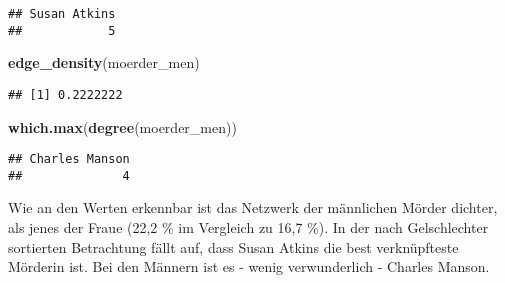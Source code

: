 \documentclass[
]{article}
\newenvironment{Shaded}{\begin{snugshade}}{\end{snugshade}}
\newcommand{\KeywordTok}[1]{\textcolor[rgb]{0.13,0.29,0.53}{\textbf{#1}}}
\newcommand{\NormalTok}[1]{#1}
\begin{document}
\begin{verbatim}
## Susan Atkins 
##            5
\end{verbatim}

\begin{Shaded}
\begin{Highlighting}[]
\KeywordTok{edge_density}\NormalTok{(moerder_men)}
\end{Highlighting}
\end{Shaded}

\begin{verbatim}
## [1] 0.2222222
\end{verbatim}

\begin{Shaded}
\begin{Highlighting}[]
\KeywordTok{which.max}\NormalTok{(}\KeywordTok{degree}\NormalTok{(moerder_men))}
\end{Highlighting}
\end{Shaded}

\begin{verbatim}
## Charles Manson 
##              4
\end{verbatim}

Wie an den Werten erkennbar ist das Netzwerk der männlichen Mörder
dichter, als jenes der Fraue (22,2 \% im Vergleich zu 16,7 \%). In der
nach Gelschlechter sortierten Betrachtung fällt auf, dass Susan Atkins
die best verknüpfteste Mörderin ist. Bei den Männern ist es - wenig
verwunderlich - Charles Manson.
\end{document}
